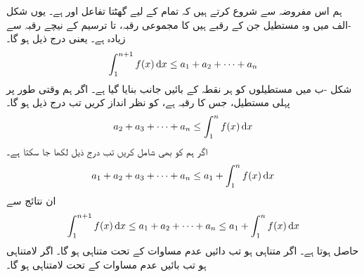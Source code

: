 ہم اس مفروضہ سے شروع کرتے ہیں کہ تمام  کے لیے  گھٹتا تفاعل  اور  ہے۔ یوں شکل -الف میں وہ مستطیل جن کے رقبے   ہیں کا مجموعی رقبہ،  تا  ترسیم  کے نیچے رقبہ سے زیادہ ہے۔ یعنی درج ذیل ہو گا۔
\begin{align*}
\int_1^{n+1}f(x)\dif x\le a_1+a_2+\cdots+a_n
\end{align*} 
شکل -ب میں مستطیلوں کو ہر نقطہ کے بائیں جانب بنایا گیا ہے۔ اگر ہم وقتی طور پر پہلی مستطیل، جس کا رقبہ  ہے، کو نظر انداز کریں تب درج ذیل ہو گا۔
\begin{align*}
a_2+a_3+\cdots+a_n\le \int_1^nf(x)\dif x
\end{align*}
اگر ہم  کو بھی شامل کریں تب درج ذیل لکھا جا سکتا ہے۔
\begin{align*}
a_1+a_2+a_3+\cdots+a_n\le a_1+\int_1^nf(x)\dif x
\end{align*}
ان نتائج سے 
\begin{align}\label{مساوات_تسلسل_عدم_مساواتیں}
\int_1^{n+1}f(x)\dif x\le a_1+a_2+\cdots+a_n\le  a_1+\int_1^nf(x)\dif x
\end{align}
حاصل ہوتا ہے۔ اگر  متناہی ہو تب دائیں عدم مساوات کے تحت  متناہی ہو گا۔  اگر  لامتناہی ہو تب بائیں عدم مساوات کے تحت  لامتناہی ہو گا۔ 

